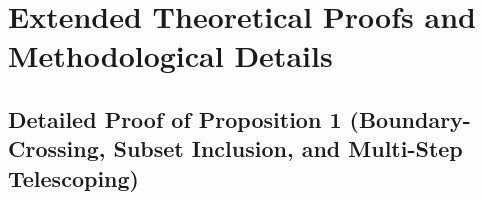 \clearpage
\setcounter{page}{1}
\maketitlesupplementary
\appendix

\renewcommand{\thetable}{S\arabic{table}}
\renewcommand{\thefigure}{S\arabic{figure}}
\setcounter{table}{0}
\setcounter{figure}{0}

\section{Extended Theoretical Proofs and Methodological Details}
\label{app:proofs}

\subsection{Detailed Proof of Proposition 1 (Boundary-Crossing, Subset Inclusion, and Multi-Step Telescoping)}

